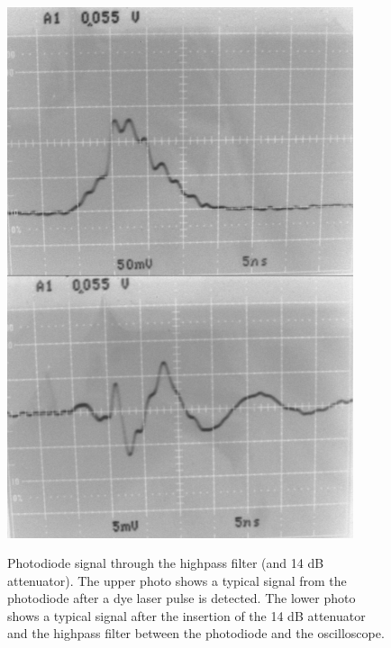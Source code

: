 \begin{figure}
\begin{center}
\leavevmode
\includegraphics[width=4in]
{filter/filter.png}\\
\end{center}
\caption[Photodiode signal through the highpass filter (and 14 dB attenuator)]{Photodiode signal through the highpass filter (and 14 dB attenuator). The upper photo shows a typical signal from the photodiode after a dye laser pulse is detected. The lower photo shows a typical signal after the insertion of the 14 dB attenuator and the highpass filter between the photodiode and the oscilloscope.}
\label{filter}
\end{figure}
